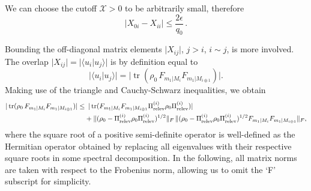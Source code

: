 We can choose the cutoff $\mathcal{X}>0$ to be arbitrarily small, therefore
\begin{equation}
\vert X_{0i} - X_{ii} \vert \leq \frac{2\epsilon}{q_0}\,.
\end{equation}

Bounding the off-diagonal matrix elements $\vert X_{ij}\vert$, $j>i$, $i \sim j$, is more involved. The overlap $\vert X_{ij} \vert = \vert \langle u_i \vert u_j \rangle \vert$ is by definition equal to
\begin{equation}
\vert \langle u_i \vert u_j \rangle \vert = \vert \operatorname{tr}(\rho_0 \, F_{m_1\vert M_i} F_{m_1\vert M_{i\oplus 1}}) \vert.
\end{equation}
Making use of the triangle and Cauchy-Schwarz inequalities, we obtain
\begin{equation}
\label{eqn:initialbound}
\begin{split}
\vert \operatorname{tr}(\rho_0 \, F_{m_1\vert M_i} F_{m_1\vert M_{i\oplus 1}}) \vert \leq &\hspace{0.5em} \vert \operatorname{tr}(F_{m_1\vert M_i} F_{m_1\vert M_{i \oplus 1}}\Pi_{\text{relev}}^{(i)}\rho_0\Pi_{\text{relev}}^{(i)})\vert \\ & + \|(\rho_0-\Pi_{\text{relev}}^{(i)}\rho_0\Pi_{\text{relev}}^{(i)})^{1/2}\|_F\,\|(\rho_0-\Pi_{\text{relev}}^{(i)}\rho_0\Pi_{\text{relev}}^{(i)})^{1/2} F_{m_1\vert M_i} F_{m_1\vert M_{i\oplus 1}}\|_F,
\end{split}
\end{equation}
where the square root of a positive semi-definite operator is well-defined as the Hermitian operator obtained by replacing all eigenvalues with their respective square roots in some spectral decomposition. In the following, all matrix norms are taken with respect to the Frobenius norm, allowing us to omit the `F' subscript for simplicity.


